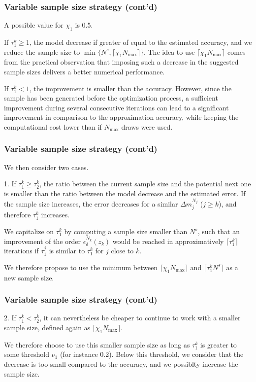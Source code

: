\documentclass{beamer}
\begin{document}
\begin{frame}
\frametitle{Variable sample size strategy (cont'd)}

A possible value for $\chi_1$ is 0.5.

\mbox{}

If $\tau_1^k \geq 1$, the model decrease if greater of equal to the estimated accuracy, and we reduce the sample size to $\min\{ N^s, \lceil \chi_1 N_{\max}
\rceil \}$.
The idea to use $\lceil \chi_1 N_{\max} \rceil$ comes from the practical observation that imposing such a decrease in the suggested sample sizes delivers a better numerical performance.

\mbox{}

If $\tau_1^k < 1$, the improvement is smaller than the accuracy.
However, since the sample has been generated before the optimization process, a sufficient improvement during several consecutive iterations can lead to a significant improvement in comparison to the approximation accuracy, while keeping the computational cost lower than if $N_{\max}$ draws were used.

\end{frame}

\begin{frame}
\frametitle{Variable sample size strategy (cont'd)}

We then consider two cases.

\mbox{}

1. If $\tau_1^k \geq \tau_2^k$, the ratio between the current sample size and the potential next one is smaller than the ratio between the model decrease and the estimated error.
If the sample size increases, the error decreases for a similar $\Delta m_j^{N_j}$ ($j \geq k$), and therefore $\tau_1^k$ increases.

\mbox{}

We capitalize on $\tau_1^k$ by computing a sample size smaller than  $N^s$, such that an improvement of the order $\epsilon_\delta^{N_k}(z_k)$ would be reached in approximatively $\lceil \tau_1^k \rceil$ iterations if $\tau_1^j$ is similar to $\tau_1^k$ for $j$ close to $k$.

\mbox{}

We therefore propose to use the minimum between $\lceil \chi_1 N_{\max} \rceil$ and $\lceil \tau_1^k N^s \rceil$ as a new sample size.

\end{frame}

\begin{frame}
\frametitle{Variable sample size strategy (cont'd)}

2. If $\tau_1^k < \tau_2^k$, it can nevertheless be cheaper to continue to work with a smaller sample size, defined again as $\lceil \chi_1 N_{\max} \rceil$.

\mbox{}

We therefore choose to use this smaller sample size as long as $\tau_1^k$ is greater to some threshold $\nu_1$ (for instance 0.2).
Below this threshold, we consider that the decrease is too small compared to the accuracy, and we possiblty increase the sample size.

\end{frame}
\end{document}
